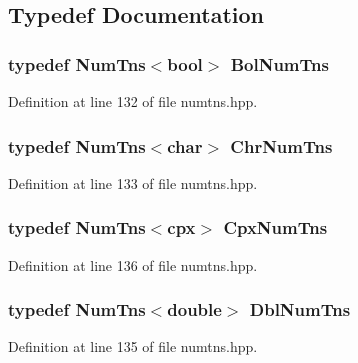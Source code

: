 \subsection{Typedef Documentation}
\subsubsection{\setlength{\rightskip}{0pt plus 5cm}typedef {\bf Num\-Tns}$<$bool$>$ {\bf Bol\-Num\-Tns}}\label{numtns_8hpp_d81bd77cdb4bbc765abf4c4eac225f40_d81bd77cdb4bbc765abf4c4eac225f40}




Definition at line 132 of file numtns.hpp.
\subsubsection{\setlength{\rightskip}{0pt plus 5cm}typedef {\bf Num\-Tns}$<$char$>$ {\bf Chr\-Num\-Tns}}\label{numtns_8hpp_76cab43a25dc760070a6d6d16fdc6622_76cab43a25dc760070a6d6d16fdc6622}




Definition at line 133 of file numtns.hpp.
\subsubsection{\setlength{\rightskip}{0pt plus 5cm}typedef {\bf Num\-Tns}$<${\bf cpx}$>$ {\bf Cpx\-Num\-Tns}}\label{numtns_8hpp_311e856241d68404e06b478b7aa16e84_311e856241d68404e06b478b7aa16e84}




Definition at line 136 of file numtns.hpp.
\subsubsection{\setlength{\rightskip}{0pt plus 5cm}typedef {\bf Num\-Tns}$<$double$>$ {\bf Dbl\-Num\-Tns}}\label{numtns_8hpp_7a8d9220bf899171c6aef87fe7ff8c63_7a8d9220bf899171c6aef87fe7ff8c63}




Definition at line 135 of file numtns.hpp.
